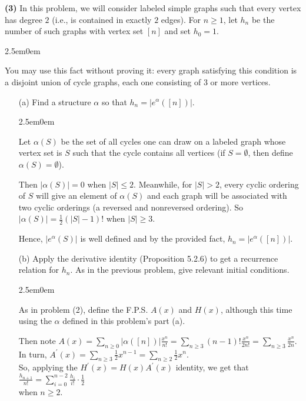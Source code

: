 \documentclass{book}
\newcommand{\exOne}{%
   \color{Purple}%
   \fontsize{13}{15}\selectfont%
}
\newenvironment{myIndent}{%
   \begin{adjustwidth}{2.5em}{0em}%
}{%
   \end{adjustwidth}%
}
\newcommand{\blab}[1]{\textbf{#1}}
\newcommand{\retTwo}{\hfill\bigbreak}
\begin{document}
\blab{(3)} In this problem, we will consider labeled simple graphs such that every vertex has degree $2$ (i.e., is contained in exactly $2$ edges). For $n \geq 1$, let $h_n$ be the number of such graphs with vertex set $[n]$ and set $h_0 = 1$.
\begin{myIndent}
	You may use this fact without proving it: every graph satisfying this condition is a disjoint union of cycle graphs, each one consisting of $3$ or more vertices.
\end{myIndent}
\begin{enumerate}
	\item[(a)] Find a structure $\alpha$ so that $h_n = |e^{\alpha}([n])|$.
	
	\begin{myIndent}\exOne
		Let $\alpha(S)$ be the set of all cycles one can draw on a labeled graph whose vertex set is $S$ such that the cycle contains all vertices (if $S = \emptyset$, then define\\ $\alpha(S) = \emptyset$).
		\retTwo

		Then $|\alpha(S)| = 0$ when $|S| \leq 2$. Meanwhile, for $|S| > 2$, every cyclic ordering of $S$ will give an element of $\alpha(S)$ and each graph will be associated with two cyclic orderings (a reversed and nonreversed ordering). So $|\alpha(S)| = \frac{1}{2}(|S| - 1)!$ when $|S| \geq 3$.\retTwo

		Hence, $|e^{\alpha}(S)|$ is well defined and by the provided fact, $h_n = |e^{\alpha}([n])|$.
	\end{myIndent}

	\item[(b)] Apply the derivative identity (Proposition 5.2.6) to get a recurrence relation for $h_n$. As in the previous problem, give relevant initial conditions.
	
	\begin{myIndent}\exOne
		As in problem (2), define the F.P.S. $A(x)$ and $H(x)$, although this time using the $\alpha$ defined in this problem's part (a).\retTwo

		Then note $A(x) = \sum\limits_{n \geq 0}|\alpha([n])|\frac{x^n}{n!} = \sum\limits_{n \geq 3}(n-1)!\frac{x^n}{2n!} = \sum\limits_{n \geq 3}\frac{x^n}{2n}$.\\ [-2pt]

		In turn, $A^\prime(x) = \sum\limits_{n \geq 3}\frac{1}{2}x^{n-1} = \sum\limits_{n \geq 2}\frac{1}{2}x^n$.\\ [-6pt]

		So, applying the $H^\prime(x) = H(x)A^\prime(x)$ identity, we get that $\frac{h_{n+1}}{n!} = \sum\limits_{i=0}^{n-2} \frac{h_i}{i!} \cdot \frac{1}{2}$\\ [-8pt] when $n \geq 2$.\\ [-8pt]


\end{myIndent}
\end{enumerate}
\end{document}

